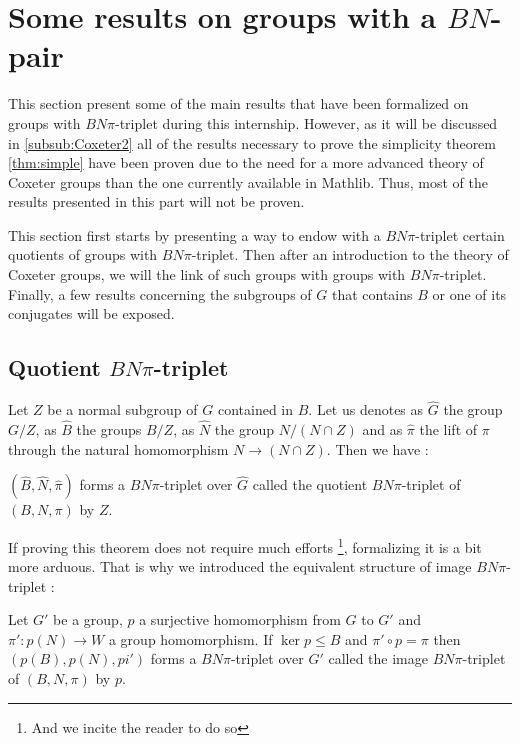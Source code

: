\section{Some results on groups with a $BN$-pair}

This section present some of the main results that have been formalized on groups with $BN\pi$-triplet during this internship. However, as it will be discussed in \ref{subsub:Coxeter2} all of the results necessary to prove the simplicity theorem \ref{thm:simple} have been proven due to the need for a more advanced theory of Coxeter groups than the one currently available in Mathlib. Thus, most of the results presented in this part will not be proven.

This section first starts by presenting a way to endow with a $BN\pi$-triplet certain quotients of groups with $BN\pi$-triplet. Then after an introduction to the theory of Coxeter groups, we will the link of such groups with groups with $BN\pi$-triplet. Finally, a few results concerning the subgroups of $G$ that contains $B$ or one of its conjugates will be exposed. 

\subsection{Quotient $BN\pi$-triplet}

    Let $Z$ be a normal subgroup of $G$ contained in $B$. Let us denotes as $\hat{G}$ the group $G /Z$, as $\hat{B}$ the groups $B/{Z}$, as $\hat{N}$ the group $N/(N\cap Z)$ and as $\hat{\pi}$ the lift of $\pi$ through the natural homomorphism $N \to (N \cap Z)$. Then we have :

\begin{definition} \label{def:quotBN}
$\left( \hat{B},\hat{N},\hat{\pi} \right)$ forms a $BN\pi$-triplet over $\hat{G}$ called the quotient $BN\pi$-triplet of $\left( B,N, \pi \right)$ by $Z$.
\end{definition}

If proving this theorem does not require much efforts \footnote{And we incite the reader to do so}, formalizing it is a bit more arduous. That is why we introduced the equivalent structure of image $BN\pi$-triplet :

\begin{definition}
Let $G'$ be a group, $p$ a surjective homomorphism from $G$ to $G'$ and $\pi': p(N) \to W$ a group homomorphism. If $\ker p \le B$ and $\pi' \circ p = \pi$ then $\left( p(B), p(N), pi' \right)$  forms a $BN\pi$-triplet over $G'$ called the image $BN\pi$-triplet of $(B,N, \pi)$ by $p$.
\end{definition}

